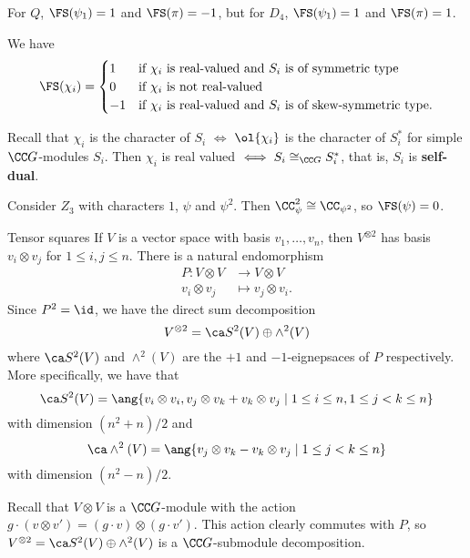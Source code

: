 \begin{exam}
  For $Q$, $\FS(\psi_1)=1$ and $\FS(\pi)=-1$, but for $D_4$, $\FS(\psi_1)=1$ and $\FS(\pi)=1$.
\end{exam}

\begin{thm}\label{16:frob-schur}
  We have
  \begin{equation*}
    \FS(\chi_i)=
    \begin{cases}
      1 &\text{if $\chi_i$ is real-valued and $S_i$ is of symmetric type} \\
      0 &\text{if $\chi_i$ is not real-valued} \\
      -1 &\text{if $\chi_i$ is real-valued and $S_i$ is of skew-symmetric type.}
    \end{cases}
  \end{equation*}
\end{thm}

\begin{rmk}
  Recall that $\chi_i$ is the character of $S_i$ $\iff$ $\ol{\chi_i}$ is the character of $S_i^*$ for simple $\CC G$-modules $S_i$.
  Then $\chi_i$ is real valued $\iff S_i \cong_{\CC G} S_i^*$, that is, $S_i$ is \textbf{self-dual}.
\end{rmk}

\begin{exam}
  Consider $Z_3$ with characters $1$, $\psi$ and $\psi^2$.
  Then $\CC_\psi^2 \cong \CC_{\psi^2}$, so $\FS(\psi)=0$.
\end{exam}

Tensor squares
If $V$ is a vector space with basis $v_1,\ldots,v_n$, then $V^{\otimes 2}$ has basis $v_i \otimes v_j$ for $1 \leq i,j \leq n$.
There is a natural endomorphism
\begin{align*}
  P: V \otimes V &\to V \otimes V \\
  v_i \otimes v_j &\mapsto v_j \otimes v_i.
\end{align*}
Since $P^2=\id$, we have the direct sum decomposition
\[ V^{\otimes 2} = \ca S^2 (V) \oplus \wedge^2 (V) \]
where $\ca S^2(V)$ and $\wedge^2(V)$ are the $+1$ and $-1$-eignepsaces of $P$ respectively.
More specifically, we have that
\[ \ca S^2(V) = \ang{v_i \otimes v_i, v_j \otimes v_k + v_k \otimes v_j \mid 1 \leq i \leq n, 1 \leq j<k \leq n } \]
with dimension $(n^2+n)/2$ and
\[ \ca \wedge^2(V) = \ang{v_j \otimes v_k - v_k \otimes v_j \mid 1 \leq j<k \leq n } \]
with dimension $(n^2-n)/2$.

Recall that $V \otimes V$ is a $\CC G$-module with the action $g \cdot (v \otimes v') = (g \cdot v) \otimes (g \cdot v')$.
This action clearly commutes with $P$, so $V^{\otimes 2} = \ca S^2(V) \oplus \wedge^2(V)$ is a $\CC G$-submodule decomposition.

